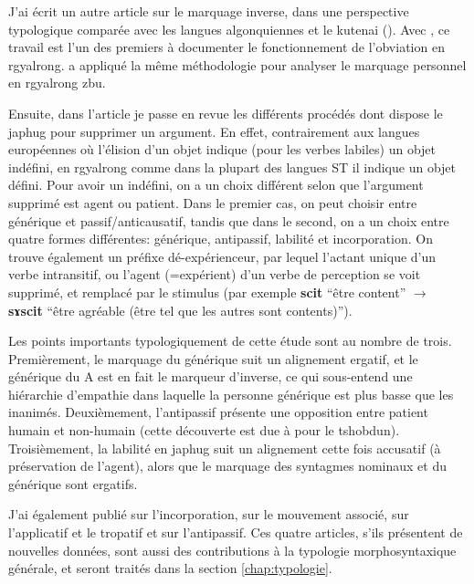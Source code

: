 \documentclass[oldfontcommands,oneside,a4paper,11pt]{memoir}
\newcommand{\ipa}[1]{{\phon\textbf{#1}}}
\begin{document}
	J'ai écrit un autre article sur le marquage inverse, dans une perspective typologique comparée avec les langues algonquiennes et le kutenai (\citealt{jacques10inverse}). Avec \citet{jackson02rentongdengdi}, ce travail est l'un des premiers à documenter le fonctionnement de l'obviation en rgyalrong.   \citet{gongxun14agreement} a appliqué la même méthodologie pour analyser le marquage personnel en rgyalrong zbu. 
	
Ensuite, dans l'article \citet{jacques12demotion}   je passe en revue les différents procédés dont dispose le japhug pour supprimer un argument. En effet, contrairement aux langues européennes où l'élision d'un objet indique (pour les verbes labiles) un objet indéfini, en rgyalrong comme dans la plupart des langues ST il indique un objet défini. Pour avoir un indéfini, on a un choix différent selon que l'argument supprimé est agent ou patient. Dans le premier cas, on peut choisir entre générique et passif/anticausatif, tandis que dans le second, on a un choix entre quatre formes différentes: générique, antipassif, labilité et incorporation. On trouve également un préfixe dé-expérienceur, par lequel l'actant unique d'un verbe intransitif, ou l'agent (=expérient) d'un verbe de perception se voit supprimé, et remplacé par le stimulus (par exemple \ipa{scit} ``être content'' $\rightarrow $ \ipa{sɤscit} ``être agréable (être tel que les autres sont contents)'').
	
	Les points importants typologiquement de cette étude sont au nombre de trois. Premièrement, le marquage du générique suit un alignement ergatif, et le générique du A est en fait le marqueur d'inverse, ce qui sous-entend une hiérarchie d'empathie dans laquelle la personne générique est plus basse que les inanimés. Deuxièmement, l'antipassif présente une opposition entre patient humain et non-humain (cette découverte est due à \citet{jackson06paisheng} pour le tshobdun). Troisièmement, la labilité en japhug suit un alignement cette fois accusatif (à préservation de l'agent), alors que le marquage des syntagmes nominaux et du générique sont ergatifs. 
	
	J'ai également publié \citet{jacques12incorp} sur l'incorporation,  \citet{jacques13harmonization} sur le mouvement associé, \citet{jacques13tropative} sur l'applicatif et le tropatif et \citet{jacques14antipassive} sur l'antipassif. Ces quatre articles, s'ils présentent de nouvelles données, sont aussi des contributions à la typologie morphosyntaxique générale, et seront traités dans la section \ref{chap:typologie}. 
	
\end{document}
